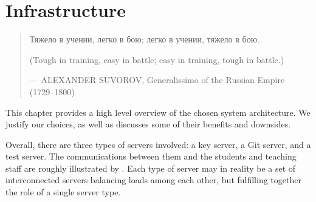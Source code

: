 
\chapter{Infrastructure}

\begin{quotation}

\footnotesize\sffamily\itshape

\begin{flushright}


Тяжело в учении, легко в бою; легко в учении, тяжело в бою.


\smallbreak

(Tough in training, easy in battle; easy in training, tough in battle.)

\smallbreak

\upshape

--- ALEXANDER SUVOROV, Generalissimo of the Russian Empire (1729--1800)

\end{flushright}

\end{quotation}

This chapter provides a high level overview of the chosen system architecture.
We justify our choices, as well as discusses some of their benefits and
downsides.

Overall, there are three types of servers involved: a key server, a Git server,
and a test server. The communications between them and the students and
teaching staff are roughly illustrated by . Each
type of server may in reality be a set of interconnected servers balancing
loads among each other, but fulfilling together the role of a single server
type.











